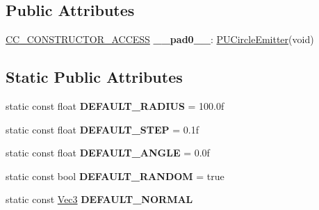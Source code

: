 \subsection*{Public Attributes}
\begin{DoxyCompactItemize}
\item 
\mbox{\label{classPUCircleEmitter_ad33383c3e52b91ac6c7ae259ac1cf49f}} 
\hyperlink{_2cocos2d_2cocos_2base_2ccConfig_8h_a25ef1314f97c35a2ed3d029b0ead6da0}{C\+C\+\_\+\+C\+O\+N\+S\+T\+R\+U\+C\+T\+O\+R\+\_\+\+A\+C\+C\+E\+SS} {\bfseries \+\_\+\+\_\+pad0\+\_\+\+\_\+}\+: \hyperlink{classPUCircleEmitter}{P\+U\+Circle\+Emitter}(void)
\end{DoxyCompactItemize}
\subsection*{Static Public Attributes}
\begin{DoxyCompactItemize}
\item 
\mbox{\label{classPUCircleEmitter_a87040574d54e584f82ab697dfb88d9ec}} 
static const float {\bfseries D\+E\+F\+A\+U\+L\+T\+\_\+\+R\+A\+D\+I\+US} = 100.\+0f
\item 
\mbox{\label{classPUCircleEmitter_a8477ef5f66805e88bcded3e74fb708e8}} 
static const float {\bfseries D\+E\+F\+A\+U\+L\+T\+\_\+\+S\+T\+EP} = 0.\+1f
\item 
\mbox{\label{classPUCircleEmitter_a25c58238b46423b7f95a2c26c478c5d2}} 
static const float {\bfseries D\+E\+F\+A\+U\+L\+T\+\_\+\+A\+N\+G\+LE} = 0.\+0f
\item 
\mbox{\label{classPUCircleEmitter_a264e6086e6846d57f3814e902593bfad}} 
static const bool {\bfseries D\+E\+F\+A\+U\+L\+T\+\_\+\+R\+A\+N\+D\+OM} = true
\item 
\mbox{\label{classPUCircleEmitter_adef883c344ca6f7a541556970308ec22}} 
static const \hyperlink{classVec3}{Vec3} {\bfseries D\+E\+F\+A\+U\+L\+T\+\_\+\+N\+O\+R\+M\+AL}
\end{DoxyCompactItemize}
